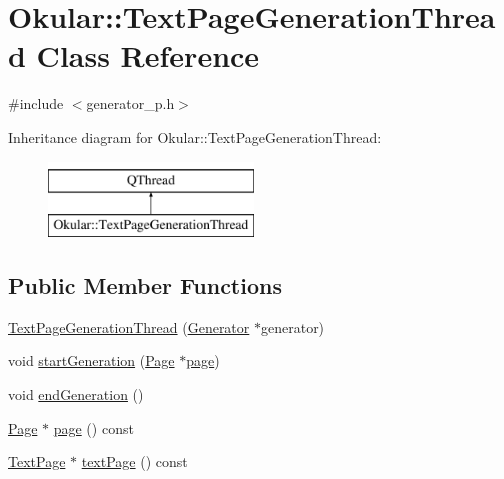 \hypertarget{classOkular_1_1TextPageGenerationThread}{\section{Okular\+:\+:Text\+Page\+Generation\+Thread Class Reference}
\label{classOkular_1_1TextPageGenerationThread}
}


{\ttfamily \#include $<$generator\+\_\+p.\+h$>$}

Inheritance diagram for Okular\+:\+:Text\+Page\+Generation\+Thread\+:\begin{figure}[H]
\begin{center}
\leavevmode
\includegraphics[height=2.000000cm]{classOkular_1_1TextPageGenerationThread}
\end{center}
\end{figure}
\subsection*{Public Member Functions}
\begin{DoxyCompactItemize}
\item 
\hyperlink{classOkular_1_1TextPageGenerationThread_ac37697accbb43aa6535707bccf81514f}{Text\+Page\+Generation\+Thread} (\hyperlink{classOkular_1_1Generator}{Generator} $\ast$generator)
\item 
void \hyperlink{classOkular_1_1TextPageGenerationThread_a5c87a0c5a53a6863e56be276018934f3}{start\+Generation} (\hyperlink{classOkular_1_1Page}{Page} $\ast$\hyperlink{classOkular_1_1TextPageGenerationThread_a1d8429d258033ea0199d02d2a85c1355}{page})
\item 
void \hyperlink{classOkular_1_1TextPageGenerationThread_a733b4aed5a97276a1644037566570bdd}{end\+Generation} ()
\item 
\hyperlink{classOkular_1_1Page}{Page} $\ast$ \hyperlink{classOkular_1_1TextPageGenerationThread_a1d8429d258033ea0199d02d2a85c1355}{page} () const 
\item 
\hyperlink{classOkular_1_1TextPage}{Text\+Page} $\ast$ \hyperlink{classOkular_1_1TextPageGenerationThread_a97fc54c8404944adc5965d315feba33d}{text\+Page} () const 
\end{DoxyCompactItemize}
